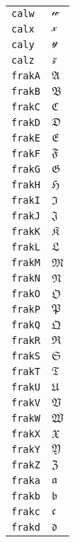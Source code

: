 \begin{longtable}{ll}
\texttt{calw}&${}{\mathcal{w}}{}$\\
\texttt{calx}&${}{\mathcal{x}}{}$\\
\texttt{caly}&${}{\mathcal{y}}{}$\\
\texttt{calz}&${}{\mathcal{z}}{}$\\
\texttt{frakA}&${}{\mathfrak{A}} {}$\\
\texttt{frakB}&${}{\mathfrak{B}} {}$\\
\texttt{frakC}&${}{\mathfrak{C}} {}$\\
\texttt{frakD}&${}{\mathfrak{D}} {}$\\
\texttt{frakE}&${}{\mathfrak{E}} {}$\\
\texttt{frakF}&${}{\mathfrak{F}} {}$\\
\texttt{frakG}&${}{\mathfrak{G}} {}$\\
\texttt{frakH}&${}{\mathfrak{H}} {}$\\
\texttt{frakI}&${}{\mathfrak{I}} {}$\\
\texttt{frakJ}&${}{\mathfrak{J}} {}$\\
\texttt{frakK}&${}{\mathfrak{K}} {}$\\
\texttt{frakL}&${}{\mathfrak{L}} {}$\\
\texttt{frakM}&${}{\mathfrak{M}} {}$\\
\texttt{frakN}&${}{\mathfrak{N}} {}$\\
\texttt{frakO}&${}{\mathfrak{O}} {}$\\
\texttt{frakP}&${}{\mathfrak{P}} {}$\\
\texttt{frakQ}&${}{\mathfrak{Q}} {}$\\
\texttt{frakR}&${}{\mathfrak{R}} {}$\\
\texttt{frakS}&${}{\mathfrak{S}} {}$\\
\texttt{frakT}&${}{\mathfrak{T}} {}$\\
\texttt{frakU}&${}{\mathfrak{U}} {}$\\
\texttt{frakV}&${}{\mathfrak{V}} {}$\\
\texttt{frakW}&${}{\mathfrak{W}} {}$\\
\texttt{frakX}&${}{\mathfrak{X}} {}$\\
\texttt{frakY}&${}{\mathfrak{Y}} {}$\\
\texttt{frakZ}&${}{\mathfrak{Z}} {}$\\
\texttt{fraka}&${}{\mathfrak{a}} {}$\\
\texttt{frakb}&${}{\mathfrak{b}} {}$\\
\texttt{frakc}&${}{\mathfrak{c}} {}$\\
\texttt{frakd}&${}{\mathfrak{d}} {}$\\

\end{longtable}
